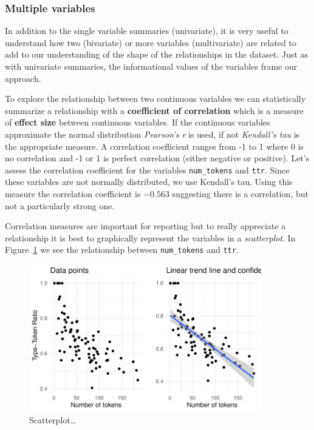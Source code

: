 \documentclass[
  letterpaper,
]{latex/krantz}
\begin{document}
\hypertarget{multiple-variables}{%
\subsubsection{Multiple variables}\label{multiple-variables}}

In addition to the single variable summaries (univariate), it is very
useful to understand how two (bivariate) or more variables
(multivariate) are related to add to our understanding of the shape of
the relationships in the dataset. Just as with univariate summaries, the
informational values of the variables frame our approach.

To explore the relationship between two continuous variables we can
statistically summarize a relationship with a \textbf{coefficient of
correlation} which is a measure of \textbf{effect size} between
continuous variables. If the continuous variables approximate the normal
distribution \emph{Pearson's r} is used, if not \emph{Kendall's tau} is
the appropriate measure. A correlation coefficient ranges from -1 to 1
where 0 is no correlation and -1 or 1 is perfect correlation (either
negative or positive). Let's assess the correlation coefficient for the
variables \texttt{num\_tokens} and \texttt{ttr}. Since these variables
are not normally distributed, we use Kendall's tau. Using this measure
the correlation coefficient is \(-0.563\) suggesting there is a
correlation, but not a particularly strong one.

Correlation measures are important for reporting but to really
appreciate a relationship it is best to graphically represent the
variables in a \emph{scatterplot}. In
Figure~\ref{fig-summaries-bivariate-scatterplot-belc} we see the
relationship between \texttt{num\_tokens} and \texttt{ttr}.

\begin{figure}

{\centering \includegraphics[width=0.9\textwidth,height=\textheight]{./approaching-analysis_files/figure-pdf/fig-summaries-bivariate-scatterplot-belc-1.pdf}

}

\caption{\label{fig-summaries-bivariate-scatterplot-belc}Scatterplot\ldots{}}

\end{figure}
\end{document}
